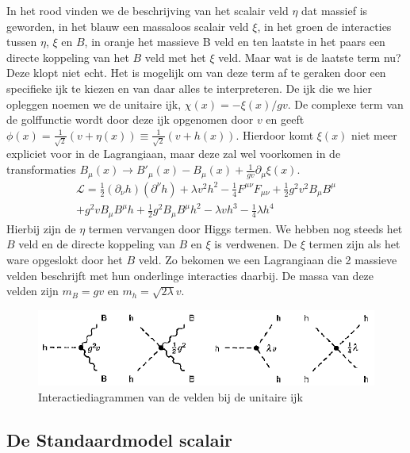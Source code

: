 \documentclass[../main.tex]{subfiles}
\begin{document}
In het rood vinden we de beschrijving van het scalair veld $\eta$ dat massief is geworden, in het blauw een massaloos scalair veld $\xi$, in het groen de interacties tussen $\eta$, $\xi$ en $B$, in oranje het massieve B veld en ten laatste in het paars een directe koppeling van het $B$ veld met het $\xi$ veld. Maar wat is de laatste term nu? Deze klopt niet echt. Het is mogelijk om van deze term af te geraken door een specifieke ijk te kiezen en van daar alles te interpreteren. De ijk die we hier opleggen noemen we de unitaire ijk, $\chi(x) = -\xi(x)/gv$. De complexe term van de golffunctie wordt door deze ijk opgenomen door $v$ en geeft $\phi(x) = \frac{1}{\sqrt{2}} (v+\eta(x)) \equiv \frac{1}{\sqrt{2}} (v+h(x))$. Hierdoor komt $\xi(x)$ niet meer expliciet voor in de Lagrangiaan, maar deze zal wel voorkomen in de transformaties $B_\mu (x) \rightarrow B'_\mu(x) - B_\mu(x) + \frac{1}{gv} \partial_\mu \xi(x)$.
\begin{equation}
    \begin{aligned}
        \label{eq:comp_scal_veld_lagr_unitaire_ijk}
        \mathcal{L} = \frac{1}{2} (\partial_\nu h)(\partial^\nu h) + \lambda v^2 h^2 - \frac{1}{4} F^{\mu\nu}F_{\mu\nu} + \frac{1}{2} g^2v^2B_\mu B^\mu\\
        + g^2vB_\mu B^\mu h + \frac{1}{2} g^2 B_\mu B^\mu h^2 - \lambda vh^3 - \frac{1}{4} \lambda h^4
    \end{aligned}
\end{equation}
Hierbij zijn de $\eta$ termen vervangen door Higgs termen. We hebben nog steeds het $B$ veld en de directe koppeling van $B$ en $\xi$ is verdwenen. De $\xi$ termen zijn als het ware opgeslokt door het $B$ veld. Zo bekomen we een Lagrangiaan die 2 massieve velden beschrijft met hun onderlinge interacties daarbij. De massa van deze velden zijn $m_B = gv$ en $m_h = \sqrt{2\lambda}v$.

\begin{figure}[h]
    \centering
    \includegraphics[width=0.8\linewidth]{higgs_boson/complex_scal_int_unitaire_ijk.png}
    \caption{Interactiediagrammen van de velden bij de unitaire ijk}%
    \label{fig:higgs_boson/complex_scal_int_unitaire_ijk}
\end{figure}

\subsection{De Standaardmodel scalair}%
\label{sub:het_standaard_model_scalair}
\end{document}
